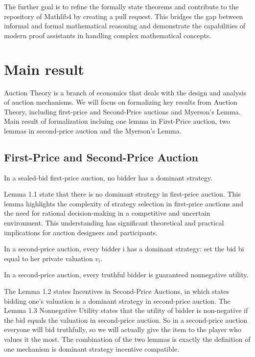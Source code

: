 The further goal is to refine the formally state theorems and contribute to the repository of Mathlib4 by creating a pull request. This bridges the gap between informal and formal mathematical reasoning and demonstrate the capabilities of modern proof assistants in handling complex mathematical concepts.


\section{Main result}
Auction Theory is a branch of economics that deals with the design and analysis of auction mechanisms. We will focus on formalizing key results from Auction Theory, including first-price and Second-Price auctions and Myerson's Lemma. Main result of formalization incluing one lemma in First-Price auction, two lemmas in second-price auction and the Myerson's Lemma.

\subsection{First-Price and Second-Price Auction}

\begin{lemma}
In a sealed-bid first-price auction, no bidder has a dominant strategy.
\end{lemma}
Lemma 1.1 state that there is no dominant strategy in first-price auction. This lemma highlights the complexity of strategy selection in first-price auctions and the need for rational decision-making in a competitive and uncertain environment. This understanding has significant theoretical and practical implications for auction designers and participants.

\begin{lemma}
In a second-price auction, every bidder i has a dominant strategy: set the bid bi equal to her private valuation \(v_i\).
\end{lemma}
\begin{lemma} 
In a second-price auction, every truthful bidder is guaranteed nonnegative utility.
\end{lemma}
The Lemma 1.2 states Incentives in Second-Price Auctions, in which states bidding one's valuation is a dominant strategy in second-price auction. The Lemma 1.3 Nonnegative Utility states that the utility of bidder is non-negative if the bid equals the valuation in second-price auction. So in a second-price auction everyone will bid truthfully, so we will actually give the item to the player who values it the most. The combination of the two lemmas is exactly the definition of one mechanism is dominant strategy incentive compatible.


